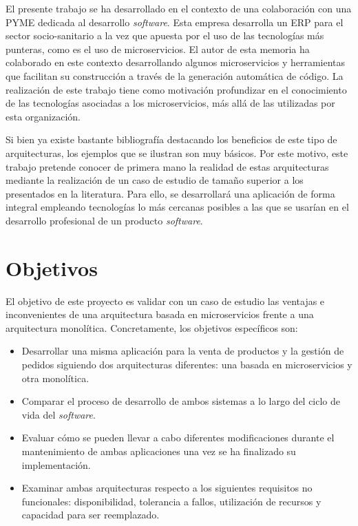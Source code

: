 \documentclass[11pt,spanish,listoffigures]{tfgetsinf}
\begin{document}
El presente trabajo se ha desarrollado en el contexto de una colaboración con una PYME dedicada al desarrollo \textit{software}. Esta empresa desarrolla un ERP para el sector socio-sanitario a la vez que apuesta por el uso de las tecnologías más punteras, como es el uso de microservicios. El autor de esta memoria ha colaborado en este contexto desarrollando algunos microservicios y herramientas que facilitan su construcción a través de la generación automática de código. La realización de este trabajo tiene como motivación profundizar en el conocimiento de las tecnologías asociadas a los microservicios, más allá de las utilizadas por esta organización.

Si bien ya existe bastante bibliografía destacando los beneficios de este tipo de arquitecturas, los ejemplos que se ilustran son muy básicos. Por este motivo, este trabajo pretende conocer de primera mano la realidad de estas arquitecturas mediante la realización de un caso de estudio de tamaño superior a los presentados en la literatura. Para ello, se desarrollará una aplicación de forma integral empleando tecnologías lo más cercanas posibles a las que se usarían en el desarrollo profesional de un producto \textit{software}.

\newpage

\section{Objetivos}

El objetivo de este proyecto es validar con un caso de estudio las ventajas e inconvenientes de una arquitectura basada en microservicios frente a una arquitectura monolítica. Concretamente, los objetivos específicos son:

\begin{itemize}

\item Desarrollar una misma aplicación para la venta de productos y la gestión de pedidos siguiendo dos arquitecturas diferentes: una basada en microservicios y otra monolítica.

\item Comparar el proceso de desarrollo de ambos sistemas a lo largo del ciclo de vida del \textit{software}.

\item Evaluar cómo se pueden llevar a cabo diferentes modificaciones durante el mantenimiento de ambas aplicaciones una vez se ha finalizado su implementación.

\item Examinar ambas arquitecturas respecto a los siguientes requisitos no funcionales: disponibilidad, tolerancia a fallos, utilización de recursos y capacidad para ser reemplazado.

\end{itemize}
\end{document}
